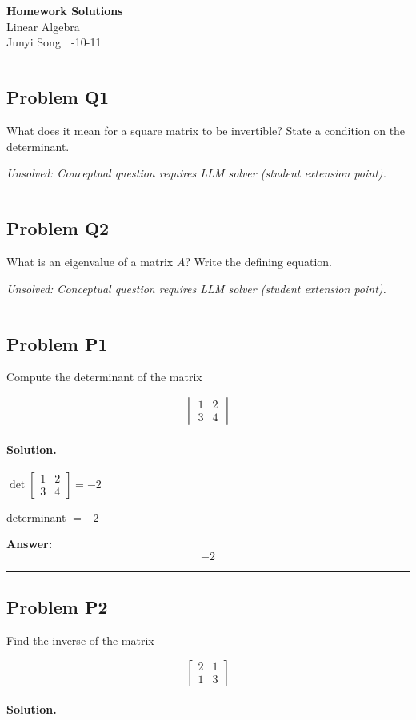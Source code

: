 \documentclass[12pt, a4paper]{article}
\newcommand{\problem}[1]{\subsection*{Problem #1}}
\newcommand{\solution}{\paragraph{Solution.}}
\begin{document}
\begin{center}
    {\LARGE\bfseries Homework Solutions} \\[0.5em]
    {\large Linear Algebra} \\[0.3em]
    Junyi Song \quad | -10-11
\end{center}

\hrule
\vspace{1em}
\problem{Q1}

What does it mean for a square matrix to be invertible? State a condition on the determinant.

\textit{\color{red} Unsolved: Conceptual question requires LLM solver (student extension point).}

\vspace{1em}
\hrule
\vspace{1em}

\problem{Q2}

What is an eigenvalue of a matrix $A$? Write the defining equation.

\textit{\color{red} Unsolved: Conceptual question requires LLM solver (student extension point).}

\vspace{1em}
\hrule
\vspace{1em}

\problem{P1}

Compute the determinant of the matrix

$$\begin{vmatrix}1 & 2\\3 & 4\end{vmatrix}$$

\solution

$\det \left[\begin{matrix}1 & 2\\3 & 4\end{matrix}\right] = -2$

determinant $= -2$

\textbf{Answer:}
\[\boxed{-2}\]

\vspace{1em}
\hrule
\vspace{1em}

\problem{P2}

Find the inverse of the matrix

$$\begin{bmatrix}2 & 1\\1 & 3\end{bmatrix}$$

\solution
\end{document}

